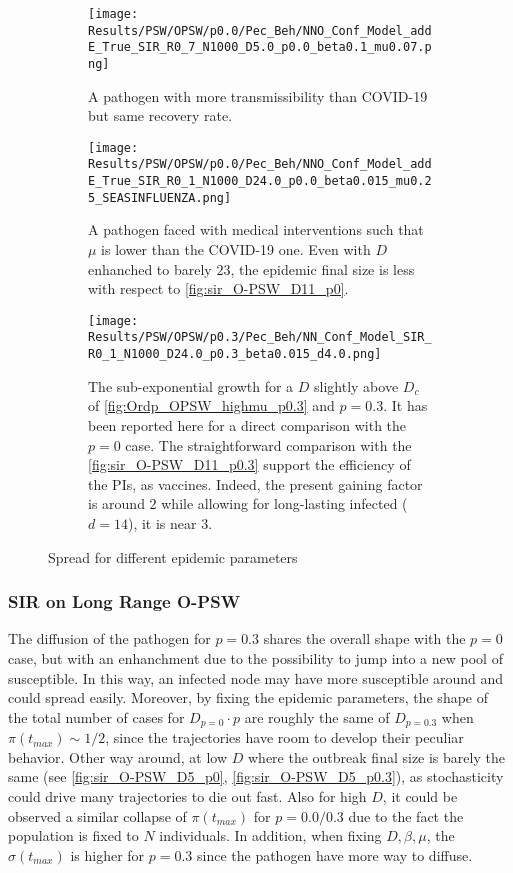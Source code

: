 \documentclass[a4paper,10pt,twoside]{book} %
\theoremstyle{definition}
\begin{document}
\begin{figure}[p]
	\centering
	\begin{subfigure}{\linewidth}
		\centering
		\texttt{[image: Results/PSW/OPSW/p0.0/Pec\_Beh/NNO\_Conf\_Model\_addE\_True\_SIR\_R0\_7\_N1000\_D5.0\_p0.0\_beta0.1\_mu0.07.png]}
		\caption{A pathogen with more transmissibility than COVID-19 but same recovery rate.}
		\label{fig:sir_O-PSW_D5_d14_b0.1}
	\end{subfigure}
	\vfill
	\begin{subfigure}[t]{\linewidth}
		\centering
		\texttt{[image: Results/PSW/OPSW/p0.0/Pec\_Beh/NNO\_Conf\_Model\_addE\_True\_SIR\_R0\_1\_N1000\_D24.0\_p0.0\_beta0.015\_mu0.25\_SEASINFLUENZA.png]}
		\caption{A pathogen faced with medical interventions such that $\mu$ is lower than the COVID-19 one. Even with $D$ enhanched to barely $23$, the epidemic final size is less with respect to \autoref{fig:sir_O-PSW_D11_p0}.}
		\label{fig:sir_O-PSW_D23_d4}
	\end{subfigure}
	\vfill
	\begin{subfigure}{\linewidth}
		\centering
		\texttt{[image: Results/PSW/OPSW/p0.3/Pec\_Beh/NN\_Conf\_Model\_SIR\_R0\_1\_N1000\_D24.0\_p0.3\_beta0.015\_d4.0.png]}
		\caption{The sub-exponential growth for a $D$ slightly above $D_c$ of \autoref{fig:Ordp_OPSW_highmu_p0.3} and $p = 0.3.$ It has been reported here for a direct comparison with the $p = 0$ case. The straightforward comparison with the \autoref{fig:sir_O-PSW_D11_p0.3} support the efficiency of the PIs, as vaccines. Indeed, the present gaining factor is around $2$ while allowing for long-lasting infected ($d = 14$), it is near $3$.}
		\label{fig:sir_O-PSW_D24_d4}
	\end{subfigure}
	\caption{Spread for different epidemic parameters}
	\label{fig:OPSW_COVID_p0.3}
\end{figure}

\subsubsection*{SIR on Long Range O-PSW}
The diffusion of the pathogen for $p = 0.3$ shares the overall shape with the $p = 0$ case, but with an enhanchment due to the possibility to jump into a new pool of susceptible. In this way, an infected node may have more susceptible around and could spread easily. Moreover, by fixing the epidemic parameters, the shape of the total number of cases for $D_{p=0} \cdot p$ are roughly the same of $D_{p=0.3}$ when $\pi(t_{max}) \sim 1/2$, since the trajectories have room to develop their peculiar behavior. Other way around, at low $D$ where the outbreak final size is barely the same (see \autoref{fig:sir_O-PSW_D5_p0}, 
\autoref{fig:sir_O-PSW_D5_p0.3}), as stochasticity could drive many trajectories to die out fast. Also for high $D$, it could be observed a similar collapse of $\pi(t_{max})$ for $p = 0.0 / 0.3$  due to the fact the population is fixed to $N$ individuals. 
In addition, when fixing $D, \beta, \mu$, the $\sigma(t_{max})$ is higher for $p = 0.3$ since the pathogen have more way to diffuse.
\end{document}
